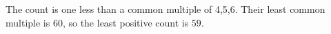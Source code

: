 The count is one less than a common multiple of 4,5,6. Their least common multiple is 60, so the least positive count is $\boxed{59}$.
